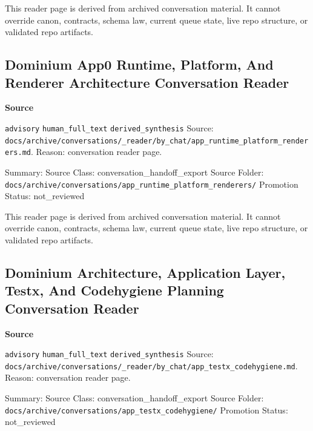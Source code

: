 \documentclass[9pt,a4paper,openany]{book}
\newcommand{\vonecallout}[3]{\par\medskip\noindent\begingroup\setlength{\fboxsep}{7pt}\colorbox{DomCalloutBg}{\parbox{0.94\linewidth}{\textbf{\textcolor{#1}{#2}}\par #3}}\endgroup\par\medskip}
\begin{document}
This reader page is derived from archived conversation material.\allowbreak{} It cannot override canon, contracts, schema law, current queue state, live repo structure, or validated repo artifacts.\allowbreak{}



\subsection{Dominium App0 Runtime, Platform, And Renderer Architecture Conversation Reader}

\vonecallout{DomSlate}{Source}{\texttt{advisory} \texttt{human\_\allowbreak{}full\_\allowbreak{}text} \texttt{derived\_\allowbreak{}synthesis} Source: \texttt{docs/\allowbreak{}archive/\allowbreak{}conversations/\allowbreak{}\_\allowbreak{}reader/\allowbreak{}by\_\allowbreak{}chat/\allowbreak{}app\_\allowbreak{}runtime\_\allowbreak{}platform\_\allowbreak{}renderers.\allowbreak{}md}.\allowbreak{} Reason: conversation reader page.\allowbreak{}}

Summary: Source Class: conversation\_\allowbreak{}handoff\_\allowbreak{}export Source Folder: \texttt{docs/\allowbreak{}archive/\allowbreak{}conversations/\allowbreak{}app\_\allowbreak{}runtime\_\allowbreak{}platform\_\allowbreak{}renderers/\allowbreak{}} Promotion Status: not\_\allowbreak{}reviewed


This reader page is derived from archived conversation material.\allowbreak{} It cannot override canon, contracts, schema law, current queue state, live repo structure, or validated repo artifacts.\allowbreak{}



\subsection{Dominium Architecture, Application Layer, Testx, And Codehygiene Planning Conversation Reader}

\vonecallout{DomSlate}{Source}{\texttt{advisory} \texttt{human\_\allowbreak{}full\_\allowbreak{}text} \texttt{derived\_\allowbreak{}synthesis} Source: \texttt{docs/\allowbreak{}archive/\allowbreak{}conversations/\allowbreak{}\_\allowbreak{}reader/\allowbreak{}by\_\allowbreak{}chat/\allowbreak{}app\_\allowbreak{}testx\_\allowbreak{}codehygiene.\allowbreak{}md}.\allowbreak{} Reason: conversation reader page.\allowbreak{}}

Summary: Source Class: conversation\_\allowbreak{}handoff\_\allowbreak{}export Source Folder: \texttt{docs/\allowbreak{}archive/\allowbreak{}conversations/\allowbreak{}app\_\allowbreak{}testx\_\allowbreak{}codehygiene/\allowbreak{}} Promotion Status: not\_\allowbreak{}reviewed
\end{document}
